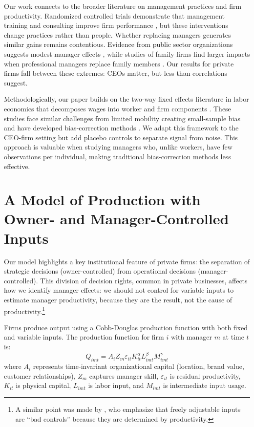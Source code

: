 \documentclass[11pt,a4paper]{article}
\begin{document}
Our work connects to the broader literature on management practices and firm productivity. Randomized controlled trials demonstrate that management training and consulting improve firm performance \citep{bloom2013does}, but these interventions change practices rather than people. Whether replacing managers generates similar gains remains contentious. Evidence from public sector organizations suggests modest manager effects \citep{fenizia2022managers, janke2024role}, while studies of family firms find larger impacts when professional managers replace family members \citep{bennedsen2007inside}. Our results for private firms fall between these extremes: CEOs matter, but less than correlations suggest.

Methodologically, our paper builds on the two-way fixed effects literature in labor economics that decomposes wages into worker and firm components \citep{Abowd1999Econometrica, Card2018JoLE}. These studies face similar challenges from limited mobility creating small-sample bias \citep{andrews2008high} and have developed bias-correction methods \citep{Bonhomme2023-dx, gaure2014correlation}. We adapt this framework to the CEO-firm setting but add placebo controls to separate signal from noise. This approach is valuable when studying managers who, unlike workers, have few observations per individual, making traditional bias-correction methods less effective.

\section{A Model of Production with Owner- and Manager-Controlled Inputs}

Our model highlights a key institutional feature of private firms: the separation of strategic decisions (owner-controlled) from operational decisions (manager-controlled). This division of decision rights, common in private businesses, affects how we identify manager effects: we should not control for variable inputs to estimate manager productivity, because they are the result, not the cause of productivity.\footnote{A similar point was made by \citet{Gandhi2020-nu}, who emphasize that freely adjustable inputs are ``bad controls'' because they are determined by productivity.} 

Firms produce output using a Cobb-Douglas production function with both fixed and variable inputs. The production function for firm $i$ with manager $m$ at time $t$ is:
\begin{equation}\label{eq:production}
Q_{imt} = A_i Z_{m} \varepsilon_{it} K_{it}^\alpha L_{imt}^{\beta} M_{imt}^{\gamma}
\end{equation}
where $A_i$ represents time-invariant organizational capital (location, brand value, customer relationships), $Z_m$ captures manager skill, $\varepsilon_{it}$ is residual productivity, $K_{it}$ is physical capital, $L_{imt}$ is labor input, and $M_{imt}$ is intermediate input usage. 
\end{document}
